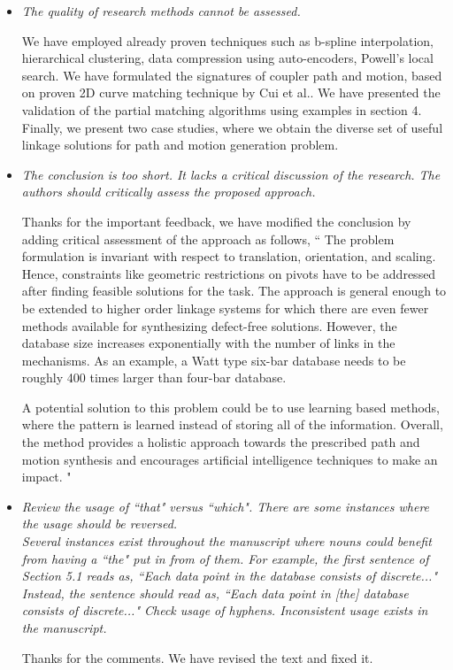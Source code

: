 \documentclass{article}
\begin{document}
\begin{itemize}
  \item \emph{
The quality of research methods cannot be assessed.
}

We have employed already proven techniques such as b-spline interpolation, hierarchical clustering, data compression using auto-encoders, Powell's local search.
We have formulated the signatures of coupler path and motion, based on proven 2D curve matching technique by Cui et al.\cite{cui2009}.
We have presented the validation of the partial matching algorithms using examples in section 4.
Finally, we present two case studies, where we obtain the diverse set of useful linkage solutions for path and motion generation problem.
\\

  \item \emph{
The conclusion is too short. It lacks a critical discussion of the research. The authors should critically assess the proposed approach.
}

Thanks for the important feedback, we have modified the conclusion by adding critical assessment of the approach as follows,
`` The problem formulation is invariant with respect to translation, orientation, and scaling.
Hence, constraints like geometric restrictions on pivots have to be addressed after finding feasible solutions for the task.
The approach is general enough to be extended to higher order linkage systems for which there are even fewer methods available for synthesizing defect-free solutions.
However, the database size increases exponentially with the number of links in the mechanisms.
As an example, a Watt type six-bar database needs to be roughly 400 times larger than four-bar database.

A potential solution to this problem could be to use learning based methods, where the pattern is learned instead of storing all of the information.
Overall, the method provides a holistic approach towards the prescribed path and motion synthesis and encourages artificial intelligence techniques to make an impact.
"

  \item \emph{
 Review the usage of ``that" versus ``which". There are some instances where the usage should be reversed.
 \\
 Several instances exist throughout the manuscript where nouns could benefit from having a ``the" put in from of them. For example, the first sentence of Section 5.1 reads as, ``Each data point in the database consists of discrete..." Instead, the sentence should read as, ``Each data point in [the] database consists of discrete..."
 Check usage of hyphens. Inconsistent usage exists in the manuscript.
 }

 Thanks for the comments. We have revised the text and fixed it.
\\

\end{itemize}
\end{document}
